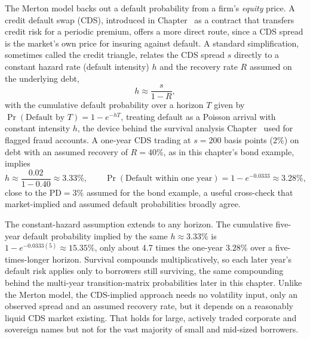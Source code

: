 \documentclass[../ai_in_finance]{subfiles}
\begin{document}
The Merton model backs out a default probability from a firm's \emph{equity} price. A credit default swap (CDS), introduced in Chapter~ as a contract that transfers credit risk for a periodic premium, offers a more direct route, since a CDS spread is the market's own price for insuring against default. A standard simplification, sometimes called the credit triangle, relates the CDS spread $s$ directly to a constant hazard rate (default intensity) $h$ and the recovery rate $R$ assumed on the underlying debt,
\begin{equation}
\label{eq:creditrisk-credit-triangle}
h \approx \frac{s}{1-R},
\end{equation}
with the cumulative default probability over a horizon $T$ given by $\Pr(\text{Default by } T) = 1-e^{-hT}$, treating default as a Poisson arrival with constant intensity $h$, the device behind the survival analysis Chapter~ used for flagged fraud accounts. A one-year CDS trading at $s=200$ basis points ($2\%$) on debt with an assumed recovery of $R=40\%$, as in this chapter's bond example, implies
\begin{equation*}
h \approx \frac{0.02}{1-0.40} \approx 3.33\%, \qquad \Pr(\text{Default within one year}) = 1-e^{-0.0333} \approx 3.28\%,
\end{equation*}
close to the $\text{PD}=3\%$ assumed for the bond example, a useful cross-check that market-implied and assumed default probabilities broadly agree.

The constant-hazard assumption extends to any horizon. The cumulative five-year default probability implied by the same $h\approx3.33\%$ is $1-e^{-0.0333(5)} \approx 15.35\%$, only about 4.7 times the one-year $3.28\%$ over a five-times-longer horizon. Survival compounds multiplicatively, so each later year's default risk applies only to borrowers still surviving, the same compounding behind the multi-year transition-matrix probabilities later in this chapter. Unlike the Merton model, the CDS-implied approach needs no volatility input, only an observed spread and an assumed recovery rate, but it depends on a reasonably liquid CDS market existing.
That holds for large, actively traded corporate and sovereign names but not for the vast majority of small and mid-sized borrowers.
\end{document}
